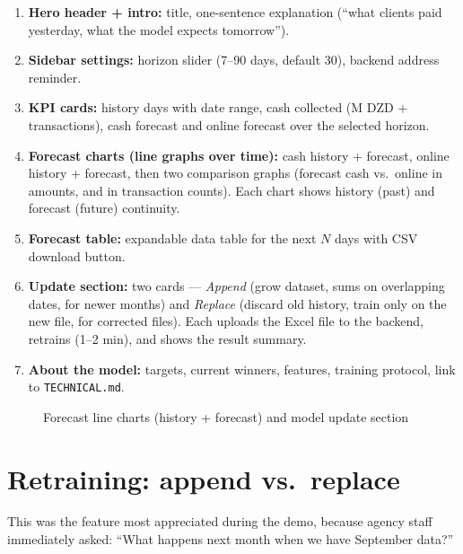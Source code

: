 \documentclass[12pt,a4paper]{report}
\begin{document}
\begin{enumerate}
\item \textbf{Hero header + intro:} title, one-sentence explanation (``what clients paid yesterday, what the model expects tomorrow'').
\item \textbf{Sidebar settings:} horizon slider (7--90 days, default 30), backend address reminder.
\item \textbf{KPI cards:} history days with date range, cash collected (M DZD + transactions), cash forecast and online forecast over the selected horizon.
\item \textbf{Forecast charts (line graphs over time):} cash history + forecast, online history + forecast, then two comparison graphs (forecast cash vs.\ online in amounts, and in transaction counts). Each chart shows history (past) and forecast (future) continuity.
\item \textbf{Forecast table:} expandable data table for the next $N$ days with CSV download button.
\item \textbf{Update section:} two cards --- \textit{Append} (grow dataset, sums on overlapping dates, for newer months) and \textit{Replace} (discard old history, train only on the new file, for corrected files). Each uploads the Excel file to the backend, retrains (1--2 min), and shows the result summary.
\item \textbf{About the model:} targets, current winners, features, training protocol, link to \texttt{TECHNICAL.md}.
\end{enumerate}

\begin{figure}[H]
\centering
{}
\caption{Forecast line charts (history + forecast) and model update section}
\end{figure}

\section{Retraining: append vs.\ replace}

This was the feature most appreciated during the demo, because agency staff immediately asked: ``What happens next month when we have September data?''
\end{document}
